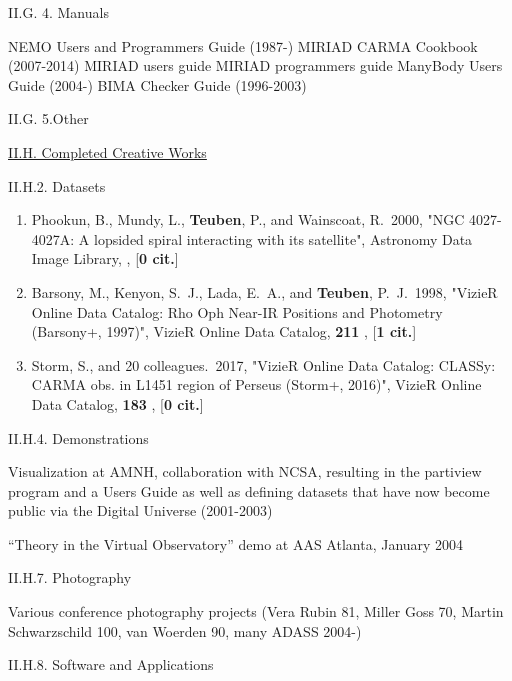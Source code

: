 \documentclass[11pt,letterpaper]{article}
\newcommand{\newi}{\newline\indent}
\begin{document}
II.G. 4. Manuals

NEMO Users and Programmers Guide (1987-)\newi
MIRIAD CARMA Cookbook (2007-2014)\newi
MIRIAD users guide\newi
MIRIAD programmers guide\newi
ManyBody Users Guide (2004-)\newi
BIMA Checker Guide (1996-2003)\newi


II.G. 5.Other


\underline{II.H. Completed Creative Works}



II.H.2. Datasets

\begin{enumerate}[resume,label=\textbf{\arabic*}.]
\item  
Phookun, B., Mundy, L., {\bf Teuben}, P., and Wainscoat, R.\  2000,  "NGC 
4027-4027A: A lopsided spiral interacting with its satellite", Astronomy 
Data Image Library,  ,  [{\bf 0 cit.}] 

\item  
Barsony, M., Kenyon, S.~J., Lada, E.~A., and {\bf Teuben}, P.~J.\  1998,  
"VizieR Online Data Catalog: Rho Oph Near-IR Positions and Photometry 
(Barsony+, 1997)", VizieR Online Data Catalog,  {\bf 211} ,  [{\bf 1 cit.}] 


\item  
Storm, S., and 20 colleagues.\  2017,  "VizieR Online Data Catalog: CLASSy: 
CARMA obs. in L1451 region of Perseus (Storm+, 2016)", VizieR Online Data 
Catalog,  {\bf 183} ,  [{\bf 0 cit.}] 
\end{enumerate}


II.H.4. Demonstrations

Visualization at AMNH, collaboration with NCSA, resulting in the
partiview program and a Users Guide as well as defining datasets that
have now become public via the Digital Universe (2001-2003)

``Theory in the Virtual Observatory'' demo at AAS  Atlanta, January 2004
                


II.H.7. Photography

Various conference photography projects (Vera Rubin 81, Miller Goss
70, Martin Schwarzschild 100, van Woerden 90, many ADASS 2004-)

II.H.8. Software and Applications
\end{document}
